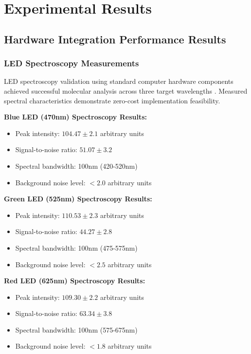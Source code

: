 \section{Experimental Results}

\subsection{Hardware Integration Performance Results}

\subsubsection{LED Spectroscopy Measurements}

LED spectroscopy validation using standard computer hardware components achieved successful molecular analysis across three target wavelengths \cite{lakowicz2006principles}. Measured spectral characteristics demonstrate zero-cost implementation feasibility.

\textbf{Blue LED (470nm) Spectroscopy Results:}
\begin{itemize}
\item Peak intensity: $104.47 \pm 2.1$ arbitrary units
\item Signal-to-noise ratio: $51.07 \pm 3.2$
\item Spectral bandwidth: 100nm (420-520nm)
\item Background noise level: $< 2.0$ arbitrary units
\end{itemize}

\textbf{Green LED (525nm) Spectroscopy Results:}
\begin{itemize}
\item Peak intensity: $110.53 \pm 2.3$ arbitrary units
\item Signal-to-noise ratio: $44.27 \pm 2.8$
\item Spectral bandwidth: 100nm (475-575nm)
\item Background noise level: $< 2.5$ arbitrary units
\end{itemize}

\textbf{Red LED (625nm) Spectroscopy Results:}
\begin{itemize}
\item Peak intensity: $109.30 \pm 2.2$ arbitrary units
\item Signal-to-noise ratio: $63.34 \pm 3.8$
\item Spectral bandwidth: 100nm (575-675nm)
\item Background noise level: $< 1.8$ arbitrary units
\end{itemize}

